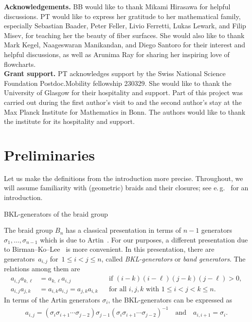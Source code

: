 \documentclass{amsart}
\makeatletter
\renewcommand\subsection{\@startsection{subsection}{2}%
  \z@{-.5\linespacing\@plus-.7\linespacing}{.5\linespacing}%
  {\normalfont\scshape}}
\theoremstyle{definition}
\theoremstyle{remark}
\theoremstyle{plain}
\newcommand{\eg}{e.\,g.~}
\makeatother
\begin{document}
\textbf{Acknowledgements.}
BB would like to thank Mikami Hirasawa for helpful discussions. PT would like to express her gratitude to her mathematical family, especially Sebastian Baader, Peter Feller, Livio Ferretti, Lukas Lewark, and Filip Misev, for teaching her the beauty of fiber surfaces. She would also like to thank Mark Kegel, Naageswaran Manikandan, and Diego Santoro for their interest and helpful discussions, as well as Arunima Ray for sharing her inspiring love of flowcharts.\\

\textbf{Grant support.} PT acknowledges support by the Swiss National Science Foundation Postdoc.Mobility fellowship 230329. She would like to thank the University of Glasgow for their hospitality and support. Part of this project was carried out during the first author's visit to and the second author's stay at the Max Planck Institute for Mathematics in Bonn. The authors would like to thank the institute for its hospitality and support. 
    

\section{Preliminaries}\label{sec:prelims}

Let us make the definitions from the introduction more precise. Throughout, we will assume familiarity with (geometric) braids and their closures; see \eg \cite{birmanbrendle} for an introduction.

\subsection{BKL-generators of the braid group}\label{subsubsec:braids_present}

The braid group $B_n$ has a classical presentation in terms of $n-1$ generators $\sigma_1, \dots, \sigma_{n-1}$ which is due to Artin~\cite{artin_1925}. For our purposes, a different presentation due to Birman--Ko--Lee~\cite{birmankolee} is more convenient. In this presentation, there are generators~$a_{i,j}$ for~$1 \leq i < j \leq n$, called \emph{BKL-generators} or \emph{band generators}. The relations among them are 
\begin{align}
    a_{i,j}a_{k,\ell} &= a_{k,\ell} a_{i,j} && \text{if } (i-k)(i-\ell)(j-k)(j-\ell) > 0, \label{rel:1}\\
    a_{i,j}a_{j,k} &= a_{i,k}a_{i,j} = a_{j,k}a_{i,k} && \text{for all } i,j,k \text{ with } 1 \leq i < j < k \leq n.\label{rel:2}
\end{align}
In terms of the Artin generators $\sigma_i$, the BKL-generators can be expressed as
\begin{align*}
a_{i,j} = \left(\sigma_i \sigma_{i+1} \cdots \sigma_{j-2} \right) \sigma_{j-1} \left(\sigma_i \sigma_{i+1} \cdots \sigma_{j-2} \right)^{-1}  \quad \text{and} \quad a_{i,i+1} = \sigma_i.
\end{align*}
\end{document}
